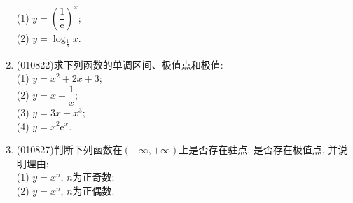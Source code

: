 \documentclass[10pt,a4paper]{article}
\begin{document}
\begin{enumerate}[1.]
(1) $y=(\dfrac 1{\mathrm{e}})^x$;\\
(2) $y=\log_{\frac 1{\mathrm{e}}}x$.
\item {\tiny (010822)}求下列函数的单调区间、极值点和极值:\\
(1) $y=x^2+2x+3$;\\
(2) $y=x+\dfrac 1x$;\\
(3) $y=3x-x^3$;\\
(4) $y=x^2\mathrm{e}^x$.
\item {\tiny (010827)}判断下列函数在$(-\infty, +\infty)$上是否存在驻点, 是否存在极值点, 并说明理由:\\
(1) $y=x^n$, $n$为正奇数;\\
(2) $y=x^n$, $n$为正偶数.
\end{enumerate}
\end{document}
